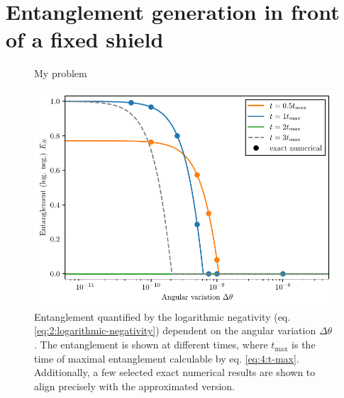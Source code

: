 \chapter{Entanglement generation in front of a fixed shield}\label{cha:entanglement-generation}


\begin{figure}[!htbp]
  \centering
  \def\svgwidth{\textwidth}
  
  \caption{My problem}
  \label{fig:4:problem-scetch}
\end{figure}

\begin{figure}[!htbp]
  \centering
  \includegraphics[width=\textwidth]{./../figures/theta-variance/EN-delta-theta.pdf}
  \caption{Entanglement quantified by the logarithmic negativity (eq. \eqref{eq:2:logarithmic-negativity}) dependent on the angular variation $\Delta\theta$. The entanglement is shown at different times, where $t_\mathrm{max}$ is the time of maximal entanglement calculable by eq. \eqref{eq:4:t-max}. Additionally, a few selected exact numerical results are shown to align precisely with the approximated version.}
  \label{fig:4:EN-delta-theta}
\end{figure}




